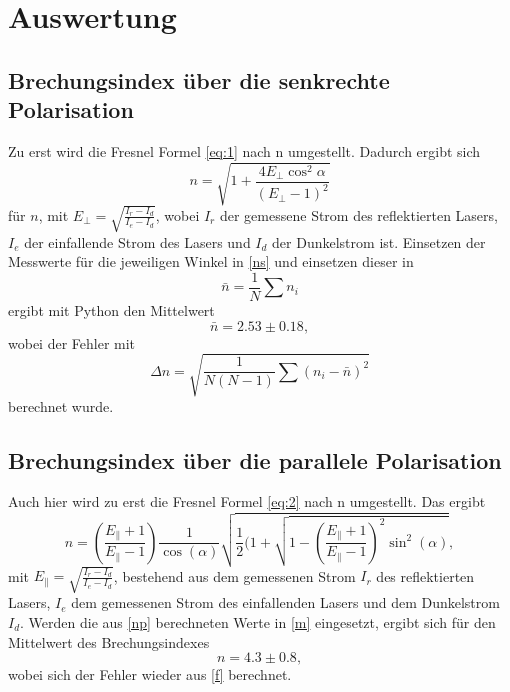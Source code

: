 \section{Auswertung}
\label{sec:Auswertung}

\subsection{Brechungsindex über die senkrechte Polarisation}
Zu erst wird die Fresnel Formel \eqref{eq:1} nach n umgestellt. Dadurch ergibt sich 
\begin{equation}
  n=\sqrt{1+\frac{4E_{\bot}\cos^2{\alpha}}{(E_{\bot}-1)^2}}
  \label{ns}
\end{equation}
für $n$, mit $E_{\bot}=\sqrt{\frac{I_r-I_d}{I_e-I_d}}$, wobei $I_r$ der gemessene Strom des reflektierten Lasers, $I_e$ der einfallende Strom des Lasers und $I_d$ der Dunkelstrom ist. Einsetzen der Messwerte für die jeweiligen Winkel in \eqref{ns} und einsetzen dieser in
\begin{equation}
  \bar n=\frac{1}{N}\sum n_i
  \label{m}
\end{equation}
ergibt mit Python den Mittelwert 
\begin{equation*}
  \bar n=2.53 \pm 0.18,
\end{equation*}
wobei der Fehler mit
\begin{equation}
  \Delta n=\sqrt{\frac{1}{N(N-1)}\sum (n_i-\bar n)^2}
  \label{f}
\end{equation}
berechnet wurde. 

\subsection{Brechungsindex über die parallele Polarisation}
Auch hier wird zu erst die Fresnel Formel \eqref{eq:2} nach n umgestellt. Das ergibt
\begin{equation}
  n=\left(\frac{E_{\|}+1}{E_{\|}-1}\right)\frac{1}{\cos(\alpha)}\sqrt{\frac{1}{2}(1+\sqrt{1-\left(\frac{E_{\|}+1}{E_{\|}-1}\right)^2\sin^2(\alpha)}},
  \label{np}
\end{equation}
mit $E_{\|}=\sqrt{\frac{I_r-I_d}{I_e-I_d}}$, bestehend aus dem gemessenen Strom $I_r$ des reflektierten Lasers, $I_e$ dem gemessenen Strom des einfallenden Lasers und dem Dunkelstrom $I_d$. Werden die aus \eqref{np} berechneten Werte in \eqref{m} eingesetzt, ergibt sich für den Mittelwert des Brechungsindexes 
\begin{equation*}
  n=4.3 \pm 0.8,
\end{equation*}
wobei sich der Fehler wieder aus \eqref{f} berechnet.

